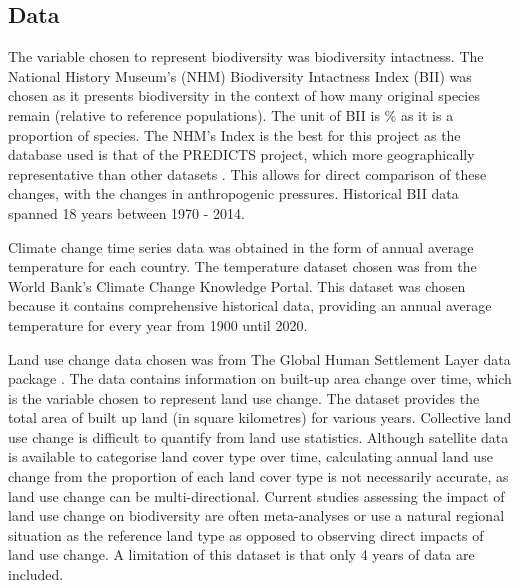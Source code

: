 \documentclass[11pt, a4paper, titlepage]{article}
\begin{document}
	\subsection*{Data}
	
	The variable chosen to represent biodiversity was biodiversity intactness. The National History Museum's (NHM) Biodiversity Intactness Index (BII)\citep{phillips2021} was chosen as it presents biodiversity in the context of how many original species remain (relative to reference populations). The unit of BII is \% as it is a proportion of species. The NHM's Index is the best for this project as the database used is that of the PREDICTS project, which more geographically representative than other datasets \citep{purvis2018modelling}. This allows for direct comparison of these changes, with the changes in anthropogenic pressures. Historical BII data spanned 18 years between 1970 - 2014. 
	
	Climate change time series data was obtained in the form of annual average temperature for each country. The temperature dataset chosen was from the World Bank's Climate Change Knowledge Portal. This dataset was chosen because it contains comprehensive historical data, providing an annual average temperature for every year from 1900 until 2020. 
	
	Land use change data chosen was from The Global Human Settlement Layer data package \citep{JRC117104}. The data contains information on built-up area change over time, which is the variable chosen to represent land use change. The dataset provides the total area of built up land (in square kilometres) for various years. Collective land use change is difficult to quantify from land use statistics. Although satellite data is available to categorise land cover type over time, calculating annual land use change from the proportion of each land cover type is not necessarily accurate, as land use change can be multi-directional. Current studies assessing the impact of land use change on biodiversity are often meta-analyses or use a natural regional situation as the reference land type \citep{de2013land} as opposed to observing direct impacts of land use change. A limitation of this dataset is that only 4 years of data are included. 
	
\end{document}
